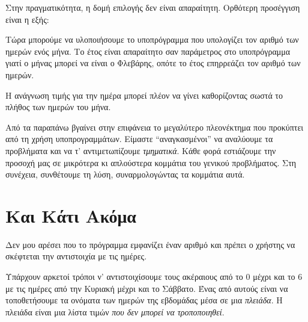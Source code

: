 \documentclass[a4paper,11pt,oneside]{book}
\begin{document}
Στην πραγματικότητα, η δομή επιλογής δεν είναι απαραίτητη. Ορθότερη προσέγγιση είναι η εξής:

{}

Τώρα μπορούμε να υλοποιήσουμε το υποπρόγραμμα που υπολογίζει τον αριθμό των ημερών ενός μήνα. Το έτος είναι απαραίτητο σαν παράμετρος στο υποπρόγραμμα γιατί ο μήνας μπορεί να είναι ο Φλεβάρης, οπότε το έτος επηρρεάζει τον αριθμό των ημερών. 


H ανάγνωση τιμής για την ημέρα μπορεί πλέον να γίνει καθορίζοντας σωστά το πλήθος των ημερών του μήνα.


Από τα παραπάνω βγαίνει στην επιφάνεια το μεγαλύτερο πλεονέκτημα που προκύπτει από τη χρήση υποπρογραμμάτων. Είμαστε ``αναγκασμένοι'' να αναλύουμε τα προβλήματα και να τ' αντιμετωπίζουμε \emph{τμηματικά}. Κάθε φορά εστιάζουμε την προσοχή μας σε μικρότερα κι απλούστερα κομμάτια του γενικού προβλήματος. Στη συνέχεια, συνθέτουμε τη λύση, συναρμολογώντας τα κομμάτια αυτά.


\section{Και Κάτι Ακόμα}

\begin{question}
Δεν μου αρέσει που το πρόγραμμα εμφανίζει έναν αριθμό και πρέπει ο χρήστης να σκέφτεται την αντιστοιχία με τις ημέρες.
\end{question}

Υπάρχουν αρκετοί τρόποι ν' αντιστοιχίσουμε τους ακέραιους από το 0 μέχρι και το 6 με τις ημέρες από την Κυριακή μέχρι και το Σάββατο. Ένας από αυτούς είναι να τοποθετήσουμε τα ονόματα των ημερών της εβδομάδας μέσα σε μια \emph{πλειάδα}. Η πλειάδα είναι μια λίστα τιμών \emph{που δεν μπορεί να τροποποιηθεί}.
\clearpage
\end{document}
